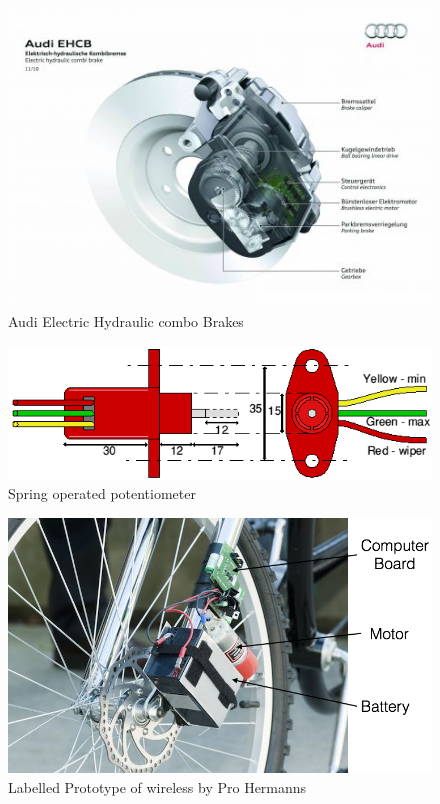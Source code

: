 \documentclass[a4paper]{report}
\begin{document}
\begin{figure}[h]
\centering
\includegraphics[scale=0.7]{figures/electronic_braking/audi_EHCB_2}
\caption{Audi Electric Hydraulic combo Brakes  \citep{audi_ehcb_2}}
\label{fig:audi_EHCB_2}
\end{figure}

\begin{figure}[h]
\centering
\includegraphics[scale=0.7]{figures/electronic_braking/spring_pot}
\caption{Spring operated potentiometer \citep{spring_pot}}
\label{fig:spring_pot}
\end{figure}

\begin{figure}[h]
\centering
\includegraphics[scale=0.5]{figures/electronic_braking/wireless_bicycle_brakes_labelled}
\caption{Labelled Prototype of wireless by Pro Hermanns \citep{wireless_bicycle_brakes}}
\label{fig:wireless_bicycle_brakes}
\end{figure}
\end{document}
